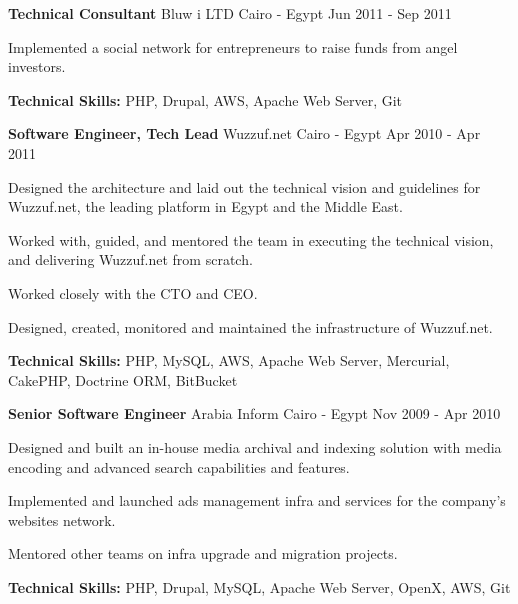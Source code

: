 \begin{cventries}
	\cventry
	{\textbf{Technical Consultant}} %
	{Bluw i LTD} %
	{Cairo - Egypt} %
	{Jun 2011 - Sep 2011} %
	{
		\begin{cvitems} %
			\item {Implemented a social network for entrepreneurs to raise funds from angel investors.}
			\item {\textbf{Technical Skills:} PHP, Drupal, AWS, Apache Web Server, Git}
		\end{cvitems}
	}

	\cventry
	{\textbf{Software Engineer, Tech Lead}} %
	{Wuzzuf.net} %
	{Cairo - Egypt} %
	{Apr 2010 - Apr 2011} %
	{
		\begin{cvitems} %
			\item {Designed the architecture and laid out the technical vision and guidelines for Wuzzuf.net, the leading
			            platform in Egypt and the Middle East.}
			\item {Worked with, guided, and mentored the team in executing the technical vision, and delivering Wuzzuf.net
			            from scratch.}
			\item {Worked closely with the CTO and CEO.}
			\item {Designed, created, monitored and maintained the infrastructure of Wuzzuf.net.}
			\item {\textbf{Technical Skills:} PHP, MySQL, AWS, Apache Web Server, Mercurial, CakePHP, Doctrine ORM, BitBucket}
		\end{cvitems}
	}

	\cventry
	{\textbf{Senior Software Engineer}} %
	{Arabia Inform} %
	{Cairo - Egypt} %
	{Nov 2009 - Apr 2010} %
	{
		\begin{cvitems} %
			\item {Designed and built an in-house media archival and indexing solution with media encoding and advanced search
			            capabilities and features.}
			\item {Implemented and launched ads management infra and services for the company’s websites network.}
			\item {Mentored other teams on infra upgrade and migration projects.}
			\item {\textbf{Technical Skills:} PHP, Drupal, MySQL, Apache Web Server, OpenX, AWS, Git}
		\end{cvitems}
	}


\end{cventries}
